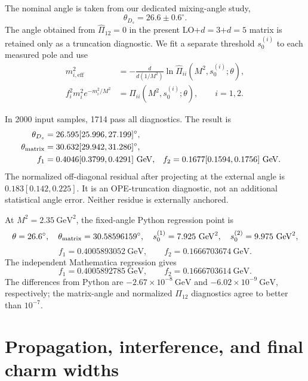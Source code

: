 \documentclass[11pt]{article}
\newcommand{\GeV}{\mathrm{GeV}}
\begin{document}
The nominal angle is taken from our dedicated mixing-angle study,
\begin{equation}
\theta_{D_s}=26.6\pm0.6^\circ.
\end{equation}
The angle obtained from $\widehat\Pi_{12}=0$ in the present
LO+$d=3$+$d=5$ matrix is retained only as a truncation diagnostic.  We fit a
separate threshold $s_0^{(i)}$ to each measured pole and use
\begin{align}
m_{i,\mathrm{eff}}^2&=-\frac{d}{d(1/M^2)}
\ln\widehat\Pi_{ii}(M^2,s_0^{(i)};\theta),\\
f_i^2m_i^2e^{-m_i^2/M^2}
&=\widehat\Pi_{ii}(M^2,s_0^{(i)};\theta),\qquad i=1,2.
\end{align}

In 2000 input samples, 1714 pass all diagnostics.  The result is
\begin{align}
\theta_{D_s}&=26.595[25.996,27.199]^\circ,\\
\theta_{\rm matrix}&=30.632[29.942,31.286]^\circ,\\
f_1&=0.4046[0.3799,0.4291]~\GeV,&
f_2&=0.1677[0.1594,0.1756]~\GeV.
\end{align}
The normalized off-diagonal residual after projecting at the external angle is
$0.183[0.142,0.225]$.  It is an OPE-truncation diagnostic, not an additional
statistical angle error.  Neither residue is externally anchored.

At $M^2=2.35~\GeV^2$, the fixed-angle Python regression point is
\begin{equation}
\theta=26.6^\circ,\quad \theta_{\rm matrix}=30.58596159^\circ,\quad
s_0^{(1)}=7.925~\GeV^2,\quad s_0^{(2)}=9.975~\GeV^2,
\end{equation}
\begin{equation}
f_1=0.4005893052~\GeV,\qquad f_2=0.1666703674~\GeV.
\end{equation}
The independent Mathematica regression gives
\begin{equation}
f_1=0.4005892785~\GeV,\qquad
f_2=0.1666703614~\GeV .
\end{equation}
The differences from Python are $-2.67\times10^{-8}~\GeV$ and
$-6.02\times10^{-9}~\GeV$, respectively; the matrix-angle and normalized
$\Pi_{12}$ diagnostics agree to better than $10^{-7}$.

\section{Propagation, interference, and final charm widths}
\end{document}
